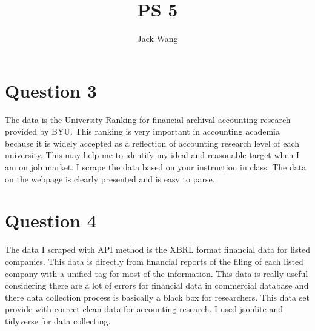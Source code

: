 \documentclass{article}
\title{PS 5}
\author{Jack Wang}
\begin{document}
\maketitle


\section{Question 3}

The data is the University Ranking for financial archival accounting research provided by BYU. 
This ranking is very important in accounting academia because it is widely accepted as a reflection of accounting research level of each university. This may help me to identify my ideal and reasonable target when I am on job market. 
I scrape the data based on your instruction in class. The data on the webpage is clearly presented and is easy to parse.

\section{Question 4}

The data I scraped with API method is the XBRL format financial data for listed companies. This data is directly from financial reports of the filing of each listed company with a unified tag for most of the information. This data is really useful considering there are a lot of errors for financial data in commercial database and there data collection process is basically a black box for researchers. This data set provide with correct clean data for accounting research.
I used jsonlite and tidyverse for data collecting.
\end{document}
